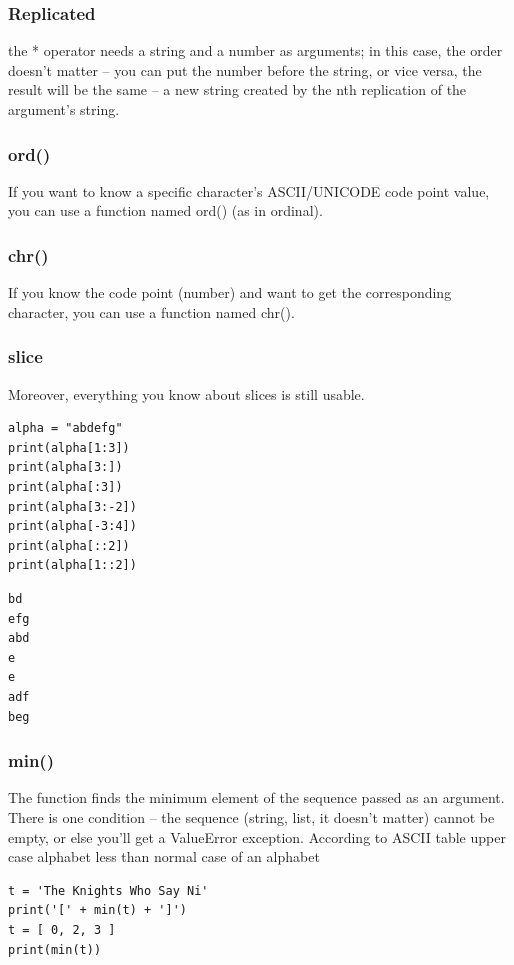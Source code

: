 \documentclass[11pt]{article}
\begin{document}
\subsubsection{Replicated}
\label{sec:orgef3c468}
the * operator needs a string and a number as arguments; in this case,
the order doesn’t matter – you can put the number before the string,
or vice versa, the result will be the same – a new string created by
the nth replication of the argument’s string.

\subsubsection{ord()}
\label{sec:org2384b9c}
If you want to know a specific character’s ASCII/UNICODE code point
value, you can use a function named ord() (as in ordinal).

\subsubsection{chr()}
\label{sec:orgd7f8145}
If you know the code point (number) and want to get the corresponding
character, you can use a function named chr().

\subsubsection{slice}
\label{sec:org8f1bb97}
Moreover, everything you know about slices is still usable. 

\begin{verbatim}
alpha = "abdefg"
print(alpha[1:3])
print(alpha[3:])
print(alpha[:3])
print(alpha[3:-2])
print(alpha[-3:4])
print(alpha[::2])
print(alpha[1::2])
\end{verbatim}

\begin{verbatim}
bd
efg
abd
e
e
adf
beg
\end{verbatim}

\subsubsection{min()}
\label{sec:org41f3abe}
The function finds the minimum element of the sequence passed as an
argument. There is one condition – the sequence (string, list, it
doesn’t matter) cannot be empty, or else you’ll get a ValueError
exception. According to ASCII table upper case alphabet less than
normal case of an alphabet

\begin{verbatim}
t = 'The Knights Who Say Ni'
print('[' + min(t) + ']')
t = [ 0, 2, 3 ]
print(min(t))
\end{verbatim}
\end{document}
